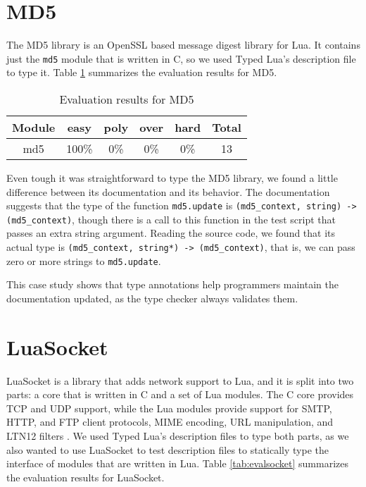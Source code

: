 \section{MD5}

The MD5 library is an OpenSSL based message digest library for Lua.
It contains just the \texttt{md5} module that is written in C,
so we used Typed Lua's description file to type it.
Table \ref{tab:evalmd5} summarizes the evaluation results for MD5.

\begin{table}[!ht]
\begin{center}
\begin{tabular}{|c|c|c|c|c|c|}
\hline
\textbf{Module} & \textbf{easy} & \textbf{poly} & \textbf{over} & \textbf{hard} & \textbf{Total} \\
\hline
md5 & 100\% & 0\% & 0\% & 0\% & 13 \\ %
\hline
\end{tabular}
\end{center}
\caption{Evaluation results for MD5}
\label{tab:evalmd5}
\end{table}

Even tough it was straightforward to type the MD5 library,
we found a little difference between its documentation and its behavior.
The documentation suggests that the type of the function \texttt{md5.update}
is \texttt{(md5\string_context, string) -> (md5\string_context)},
though there is a call to this function in the test script that passes
an extra string argument.
Reading the source code, we found that its actual type is
\texttt{(md5\string_context, string*) -> (md5\string_context)},
that is, we can pass zero or more strings to \texttt{md5.update}.

This case study shows that type annotations help programmers maintain the
documentation updated, as the type checker always validates them.

\section{LuaSocket}

LuaSocket is a library that adds network support to Lua,
and it is split into two parts: a core that is written in C and a set of
Lua modules.
The C core provides TCP and UDP support, while the Lua modules provide
support for SMTP, HTTP, and FTP client protocols, MIME encoding,
URL manipulation, and LTN12 filters \cite{nehab2008ltn012}.
We used Typed Lua's description files to type both parts, as we also
wanted to use LuaSocket to test description files to statically type
the interface of modules that are written in Lua.
Table \ref{tab:evalsocket} summarizes the evaluation results for LuaSocket.

